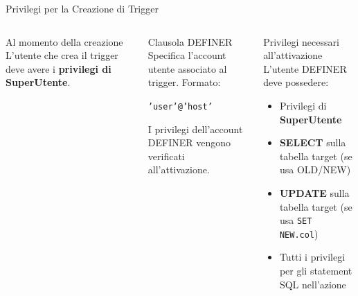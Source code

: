 \documentclass[aspectratio=169]{beamer}
\begin{document}
\begin{frame}{Privilegi per la Creazione di Trigger}
  \begin{columns}[T]
      \begin{block}{Al momento della creazione}
        L'utente che crea il trigger deve avere i \textbf{privilegi di SuperUtente}.
      \end{block}
      \vspace{0.3cm}
      \begin{block}{Clausola DEFINER}
        Specifica l'account utente associato al trigger. Formato:
        \begin{center}
          \texttt{'user'@'host'}
        \end{center}
        I privilegi dell'account DEFINER vengono verificati all'attivazione.
      \end{block}
      \begin{alertblock}{Privilegi necessari all'attivazione}
        L'utente DEFINER deve possedere:
        \begin{itemize}
          \item Privilegi di \textbf{SuperUtente}
          \item \textbf{SELECT} sulla tabella target (se usa OLD/NEW)
          \item \textbf{UPDATE} sulla tabella target (se usa \texttt{SET NEW.col})
          \item Tutti i privilegi per gli statement SQL nell'azione
        \end{itemize}
      \end{alertblock}
  \end{columns}
\end{frame}
\end{document}
